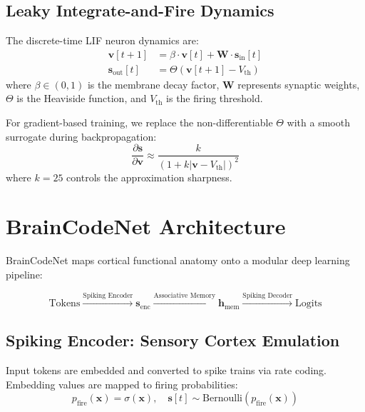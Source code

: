 \documentclass[11pt,a4paper]{article}
\newcommand{\spk}{\mathbf{s}}
\newcommand{\mem}{\mathbf{v}}
\newcommand{\W}{\mathbf{W}}
\newcommand{\x}{\mathbf{x}}
\newcommand{\h}{\mathbf{h}}
\begin{document}
\subsection{Leaky Integrate-and-Fire Dynamics}

The discrete-time LIF neuron dynamics are:
\begin{align}
    \mem[t+1] &= \beta \cdot \mem[t] + \W \cdot \spk_{\text{in}}[t] \label{eq:lif} \\
    \spk_{\text{out}}[t] &= \Theta(\mem[t+1] - V_{\text{th}}) \label{eq:spike}
\end{align}
where $\beta \in (0,1)$ is the membrane decay factor, $\W$ represents synaptic weights, $\Theta$ is the Heaviside function, and $V_{\text{th}}$ is the firing threshold.

For gradient-based training, we replace the non-differentiable $\Theta$ with a smooth surrogate during backpropagation:
\begin{equation}
    \frac{\partial \spk}{\partial \mem} \approx \frac{k}{(1 + k|\mem - V_{\text{th}}|)^2} \label{eq:surrogate}
\end{equation}
where $k=25$ controls the approximation sharpness.

\section{BrainCodeNet Architecture}

BrainCodeNet maps cortical functional anatomy onto a modular deep learning pipeline:

\begin{equation}
\text{Tokens} \xrightarrow{\text{Spiking Encoder}} \spk_{\text{enc}} \xrightarrow{\text{Associative Memory}} \h_{\text{mem}} \xrightarrow{\text{Spiking Decoder}} \text{Logits}
\end{equation}

\subsection{Spiking Encoder: Sensory Cortex Emulation}

Input tokens are embedded and converted to spike trains via rate coding. Embedding values are mapped to firing probabilities:
\begin{equation}
    p_{\text{fire}}(\x) = \sigma(\x), \quad \spk[t] \sim \text{Bernoulli}(p_{\text{fire}}(\x))
\end{equation}
\end{document}
